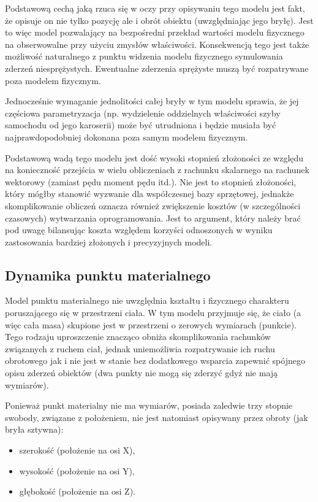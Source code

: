 \par{
Podstawową cechą jaką rzuca się w oczy przy opisywaniu tego modelu jest fakt, że opisuje on nie tylko pozycję ale i obrót obiektu (uwzględniając jego bryłę). Jest to więc model pozwalający na bezpośredni przekład wartości modelu fizycznego na obserwowalne przy użyciu zmysłów właściwości. Konsekwencją tego jest także możliwość naturalnego z punktu widzenia modelu fizycznego symulowania zderzeń niesprężystych. Ewentualne zderzenia sprężyste muszą być rozpatrywane poza  modelem fizycznym.
}
\par{
Jednocześnie wymaganie jednolitości całej bryły w tym modelu sprawia, że jej częściowa parametryzacja (np. wydzielenie oddzielnych właściwości szyby samochodu od jego karoserii) może być utrudniona i będzie musiała być najprawdopodobniej dokonana poza samym modelem fizycznym.
}
\par{
Podstawową wadą tego modelu jest dość wysoki stopnień złożoności ze względu na konieczność przejścia w wielu obliczeniach z rachunku skalarnego na rachunek wektorowy (zamiast pędu moment pędu itd.). Nie jest to stopnień złożoności, który mógłby stanowić wyzwanie dla współczesnej bazy sprzętowej, jednakże skomplikowanie obliczeń oznacza również zwiększenie kosztów (w szczególności czasowych) wytwarzania oprogramowania. Jest to argument, który należy brać pod uwagę bilansując koszta względem korzyści odnoszonych w wyniku zastosowania bardziej złożonych i precyzyjnych modeli.
}

\subsection{Dynamika punktu materialnego}
\par{
Model punktu materialnego nie uwzględnia kształtu i fizycznego charakteru poruszającego się w przestrzeni ciała. W tym modelu przyjmuje się, że ciało (a więc cała masa) skupione jest w przestrzeni o zerowych wymiarach (punkcie). Tego rodzaju uproszczenie znacząco obniża skomplikowania rachunków związanych z ruchem ciał, jednak uniemożliwia rozpatrywanie ich ruchu obrotowego jak i nie jest w stanie bez dodatkowego wsparcia zapewnić spójnego opisu zderzeń obiektów (dwa punkty nie mogą się zderzyć gdyż nie mają wymiarów).
}

\par{
Ponieważ punkt materialny nie ma wymiarów, posiada zaledwie trzy stopnie swobody, związane z położeniem, nie jest natomiast opisywany przez obroty (jak bryła sztywna):
\begin{itemize}
\item szerokość (położenie na osi X),
\item wysokość (położenie na osi Y),
\item głębokość (położenie na osi Z).
\end{itemize}
}

